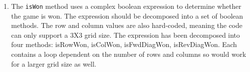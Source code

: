 \documentclass{report}
\begin{document}
\begin{enumerate}
\begin{enumerate}
\item The \texttt{isWon} method uses a complex boolean expression to determine whether
the game
 is won. The expression should be decomposed into a set of boolean methods.
 The row and column values are also hard-coded, meaning the code can only support a 3X3
 grid size. The expression has been decomposed into four methods: isRowWon, isColWon,
 isFwdDiagWon, isRevDiagWon. Each contains a loop dependent on the number of rows and
 columns so would work for a larger grid size as well.
    \end{enumerate}

\end{enumerate}
\end{document}
